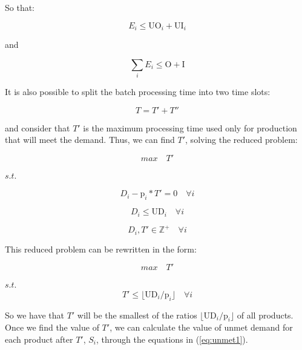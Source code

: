 \documentclass[authoryear,preprint,12pt]{elsarticle}
\begin{document}
So that:

\begin{equation}
E_i \leq \textrm{UO}_i + \textrm{UI}_i
\end{equation}

and

\begin{equation}
\sum_i {E_i} \leq \textrm{O} + \textrm{I}
\end{equation}


It is also possible to split the batch processing time into two time slots:

\begin{equation}
T = T' + T''
\end{equation}

and consider that $T'$ is the maximum processing time used only for production that will meet the demand. Thus, we can find $T'$, solving the reduced problem:

\begin{equation}
max \quad T'
\end{equation}

$s.t.$

\begin{equation}
D_i - \textrm{p}_i * T'  = 0 \quad \forall i
\end{equation}

\begin{equation}
D_i \leq \textrm{UD}_i \quad \forall i
\end{equation}

\begin{equation}
D_i, T' \in  \mathbb{Z}^+ \quad \forall i
\end{equation}

This reduced problem can be rewritten in the form:

\begin{equation}
max \quad T'
\end{equation}

$s.t.$ \\

\begin{equation}
T'  \leq \lfloor{\textrm{UD}_i / \textrm{p}_i}\rfloor \quad \forall i
\end{equation}

So we have that $T'$ will be the smallest of the ratios $\lfloor{\textrm{UD}_i / \textrm{p}_i}\rfloor$ of all products. \\

Once we find the value of $T'$, we can calculate the value of unmet demand for each product after $T'$, $S_i$, through the equations in (\ref{eq:unmet1}).
\end{document}
